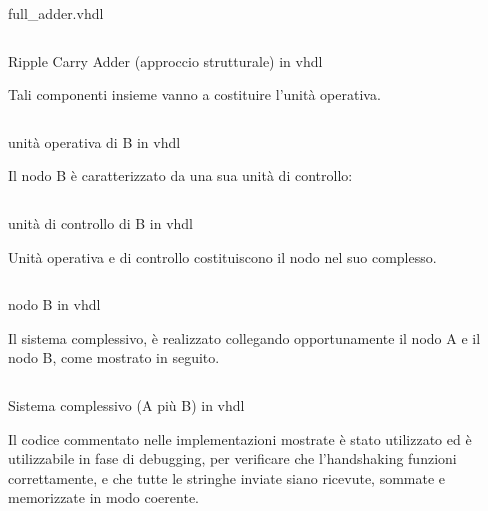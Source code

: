\begin{code}
    \inputminted[frame=lines, framesep=2mm, baselinestretch=1.2, bgcolor=LightGray, fontsize=\footnotesize, linenos]{vhdl}{vhdl_files/handshaking/full_adder.vhd}
    \caption{full\_adder.vhdl}
    \label{lbl:ROMC}
\end{code}
\begin{code}
    \inputminted[frame=lines, framesep=2mm, baselinestretch=1.2, bgcolor=LightGray, fontsize=\footnotesize, linenos]{vhdl}{vhdl_files/handshaking/RCA.vhd}
    \caption{Ripple Carry Adder (approccio strutturale) in vhdl}
    \label{lbl:ROMC}
\end{code}
Tali componenti insieme vanno a costituire l'unità operativa.
\begin{code}
    \inputminted[frame=lines, framesep=2mm, baselinestretch=1.2, bgcolor=LightGray, fontsize=\footnotesize, linenos]{vhdl}{vhdl_files/handshaking/unita_operativa_B.vhd}
    \caption{unità operativa di B in vhdl}
    \label{lbl:ROMC}
\end{code}
Il nodo B è caratterizzato da una sua unità di controllo:
\begin{code}
    \inputminted[frame=lines, framesep=2mm, baselinestretch=1.2, bgcolor=LightGray, fontsize=\footnotesize, linenos]{vhdl}{vhdl_files/handshaking/UCB.vhd}
    \caption{unità di controllo di B in vhdl}
    \label{lbl:ROMC}
\end{code}
Unità operativa e di controllo costituiscono il nodo nel suo complesso.
\begin{code}
    \inputminted[frame=lines, framesep=2mm, baselinestretch=1.2, bgcolor=LightGray, fontsize=\footnotesize, linenos]{vhdl}{vhdl_files/handshaking/nodo_B.vhd}
    \caption{nodo B in vhdl}
    \label{lbl:ROMC}
\end{code}
Il sistema complessivo, è realizzato collegando opportunamente il nodo A e il nodo B, come mostrato in seguito.
\begin{code}
    \inputminted[frame=lines, framesep=2mm, baselinestretch=1.2, bgcolor=LightGray, fontsize=\footnotesize, linenos]{vhdl}{vhdl_files/handshaking/AplusB.vhd}
    \caption{Sistema complessivo (A più B) in vhdl}
    \label{lbl:ROMC}
\end{code}
Il codice commentato nelle implementazioni mostrate è stato utilizzato ed è utilizzabile in fase di debugging, per verificare che l'handshaking funzioni correttamente, e che tutte le stringhe inviate siano ricevute, sommate e memorizzate in modo coerente.
